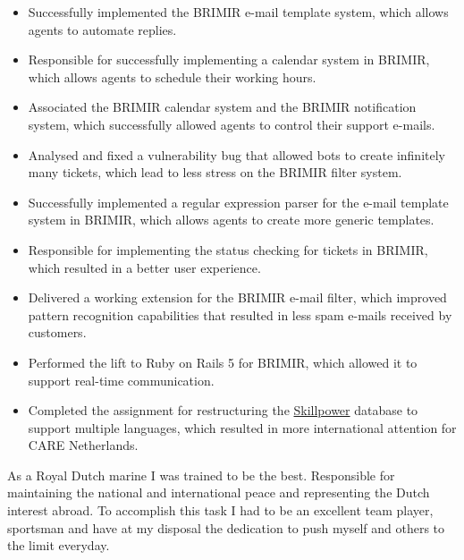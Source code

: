 {{{  \begin{itemize}
    \item Successfully implemented the BRIMIR e-mail template system, which
      allows agents to automate replies.
    \item Responsible for successfully implementing a calendar system in
      BRIMIR, which allows agents to schedule their working hours.
    \item Associated the BRIMIR calendar system and the BRIMIR notification
      system, which successfully allowed agents to control their support
      e-mails.
    \item Analysed and fixed a vulnerability bug that allowed bots to create
      infinitely many tickets, which lead to less stress on the BRIMIR filter
      system.
    \item Successfully implemented a regular expression parser for the e-mail
      template system in BRIMIR, which allows agents to create more generic
      templates.
  \end{itemize}


  \clearpage

  \framebreak
  \framebreak

  \begin{itemize}
    \item Responsible for implementing the status checking for tickets in
      BRIMIR, which resulted in a better user experience.
    \item Delivered a working extension for the BRIMIR e-mail filter, which
      improved pattern recognition capabilities that resulted in less spam
      e-mails received by customers.
    \item Performed the lift to  Ruby on Rails 5 for BRIMIR, which allowed it
      to support real-time communication.
    \item Completed the assignment for restructuring the
      \href{https://skillpower.net}{Skillpower} database to support multiple
      languages, which resulted in more international attention for CARE
      Netherlands.
  \end{itemize}
}

\SmallSep


{
  As a Royal Dutch marine I was trained to be the best. Responsible for
  maintaining the national and international peace and representing the Dutch
  interest abroad. To accomplish this task I had to be an excellent team
  player, sportsman and have at my disposal the dedication to push myself and
  others to the limit everyday.

}}}
